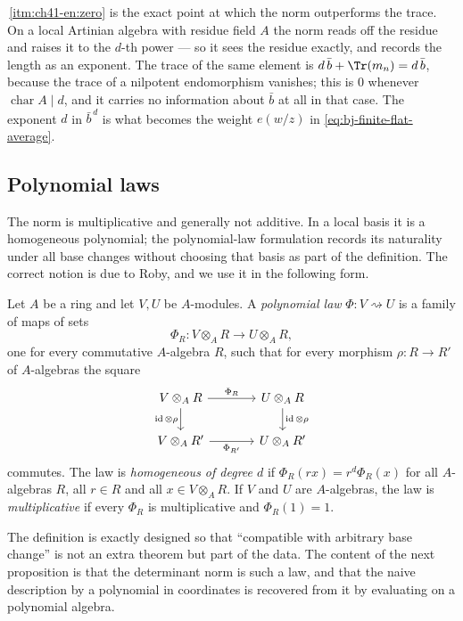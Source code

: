 \begin{remark}
\label{rem:ch41-norm-vs-trace}
\,\cref{itm:ch41-en:zero} is the exact point at
which the norm outperforms the trace.  On a local Artinian algebra with
residue field $A$ the norm reads off the residue and raises it to the
$d$-th power --- so it sees the residue exactly, and records the length as
an exponent.  The trace of the same element is
$d\,\bar b+\Tr(m_n)=d\,\bar b$, because the trace of a nilpotent
endomorphism vanishes; this is $0$ whenever $\operatorname{char}A\mid d$,
and it carries no information about $\bar b$ at all in that case.  The
exponent $d$ in $\bar b^{\,d}$ is what becomes the weight $e(w/z)$ in
\eqref{eq:bj-finite-flat-average}.
\end{remark}

\subsection{Polynomial laws}
\label{sec:ch41-polynomial-laws}

The norm is multiplicative and generally not additive.
In a local basis it is a homogeneous polynomial; the polynomial-law
formulation records its naturality under all base changes without choosing
that basis as part of the definition.  The correct notion is due to Roby, and we use
it in the following form.

\begin{definition}
\label{def:ch41-polynomial-law}
Let $A$ be a ring and let $V,U$ be $A$-modules.  A \emph{polynomial
law} $\Phi:V\rightsquigarrow U$ is a family of maps of sets
\[
 \Phi_R:V\otimes_AR\longrightarrow U\otimes_AR,
\]
one for every commutative $A$-algebra $R$, such that for every morphism
$\rho:R\to R'$ of $A$-algebras the square
\[
\begin{tikzcd}[column sep=large]
V\otimes_AR\arrow[r,"\Phi_R"]\arrow[d,"\operatorname{id}\otimes\rho"']&
U\otimes_AR\arrow[d,"\operatorname{id}\otimes\rho"]\\
V\otimes_AR'\arrow[r,"\Phi_{R'}"']&U\otimes_AR'
\end{tikzcd}
\]
commutes.  The law is \emph{homogeneous of degree $d$} if
$\Phi_R(rx)=r^d\Phi_R(x)$ for all $A$-algebras $R$, all $r\in R$ and
all $x\in V\otimes_AR$.  If $V$ and $U$ are $A$-algebras, the law is
\emph{multiplicative} if every $\Phi_R$ is multiplicative and
$\Phi_R(1)=1$.
\end{definition}

The definition is exactly designed so that ``compatible with arbitrary base
change'' is not an extra theorem but part of the data.  The content of the
next proposition is that the determinant norm is such a law, and that the
naive description by a polynomial in coordinates is recovered from it by
evaluating on a polynomial algebra.

